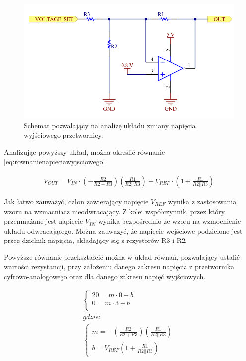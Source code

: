 \begin{figure}[h!]
    \begin{center}
        \includegraphics[width = 15cm]{images/voltageset55_3.png}
        \caption{Schemat pozwalający na analizę układu zmiany napięcia wyjściowego przetwornicy.}
        \label{fig:variableoutput2}
    \end{center}
\end{figure}

Analizując powyższy układ, można określić równanie \ref{eq:rownanienapieciawyjsciowego}.

\begin{equation}
    \label{eq:rownanienapieciawyjsciowego}
    \begin{aligned}
        V_{OUT} = V_{IN} \cdot (-\frac{R2}{R2+R3})(\frac{R1}{R2||R3}) + V_{REF} \cdot (1 + \frac{R1}{R2||R3})
    \end{aligned}
\end{equation}

Jak łatwo zauważyć, człon zawierający napięcie $V_{REF}$ wynika z zastosowania wzoru na wzmacniacz nieodwracający.
Z kolei współczynnik, przez który przemnażane jest napięcie $V_{IN}$ wynika bezpośrednio ze wzoru na wzmocnienie układu odwracającego.
Można zauwazyć, że napięcie wejściowe podzielone jest przez dzielnik napięcia, składający się z rezystorów R3 i R2.

Powyższe równanie przekształcić można w układ równań, pozwalający ustalić wartości rezystancji, przy założeniu danego zakresu napięcia z przetwornika
cyfrowo-analogowego oraz dla danego zakresu napięć wyjściowych.

\begin{equation}
    \label{eq:ukladrownanprzetwornica}
    \begin{aligned}
        \begin{cases}
            20 = m \cdot 0 + b \\
            0 = m \cdot 3 + b \\
        \end{cases} \\
        gdzie: \\
        \begin{cases}
            m = - (\frac{R2}{R2+R3})(\frac{R1}{R2||R3}) \\
            b = V_{REF} (1 + \frac{R1}{R2||R3})
        \end{cases}
    \end{aligned}
\end{equation}

